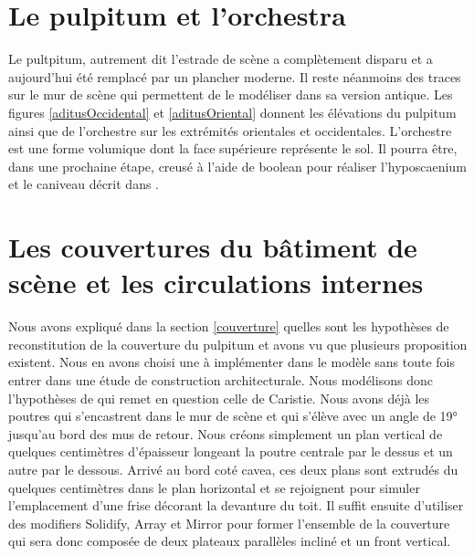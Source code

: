		\section{Le pulpitum et l'orchestra} 

Le pultpitum, autrement dit l'estrade de scène a complètement disparu et a aujourd'hui été remplacé par un plancher moderne. Il reste néanmoins des traces sur le mur de scène qui permettent de le modéliser dans sa version antique. Les figures \ref{aditusOccidental} et \ref{aditusOriental} donnent les élévations du pulpitum ainsi que de l'orchestre sur les extrémités orientales et occidentales. L'orchestre est une forme volumique dont la face supérieure représente le sol. Il pourra être, dans une prochaine étape, creusé à l'aide de \gls{boolean} pour réaliser l'hyposcaenium et le caniveau décrit dans \cite[Chap. VI]{orangeTxt}.

\section{Les couvertures du bâtiment de scène et les circulations internes}

Nous avons expliqué dans la section \ref{couverture} quelles sont les hypothèses de reconstitution de la couverture du pulpitum et avons vu que plusieurs proposition existent. Nous en avons choisi une à implémenter dans le modèle sans toute fois entrer dans une étude de construction architecturale. Nous modélisons donc l'hypothèses de \cite[Chap. I, sect. 6]{orangeTxt} qui remet en question celle de Caristie. Nous avons déjà les poutres qui s'encastrent dans le mur de scène et qui s'élève avec un angle de 19° jusqu'au bord des mus de retour. Nous créons simplement un plan vertical de quelques centimètres d'épaisseur longeant la poutre centrale par le dessus et un autre par le dessous. Arrivé au bord coté cavea, ces deux plans sont extrudés du quelques centimètres dans le plan horizontal et se rejoignent pour simuler l'emplacement d'une frise décorant la devanture du toit. Il suffit ensuite d'utiliser des modifiers Solidify, Array et Mirror pour former l'ensemble de la couverture qui sera donc composée de deux plateaux parallèles incliné et un front vertical.


